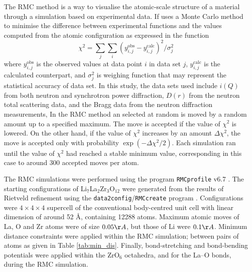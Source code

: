 \documentclass[twoside,twocolumn,9pt]{article}
\begin{document}
The RMC method is a way to visualise the atomic-scale structure of a material through a simulation based on experimental data. If uses a Monte Carlo method to minimise the difference between experimental functions and the values computed from the atomic configuration as expressed in the function
\begin{equation}
\chi^2=\sum_{j}\sum_{i}(y^ \mathrm{obs}_{i,j}-y^ \mathrm{calc}_{i,j})^2/\sigma^2_{j}
\end{equation}
where $y^\mathrm{obs}_{i,j}$ is the observed values at data point $i$ in data set $j$, $y^ \mathrm{calc}_{i,j}$ is the calculated counterpart, and  $\sigma^2_{j}$ is weighing function that may represent the statistical accuracy of data set. In this study, the data sets used include $i(Q)$ from both neutron and  synchrotron power diffraction, $D(r)$ from the neutron total scattering data, and the Bragg data from the neutron diffraction measurements, In the RMC method an selected at random is moved by a random amount up to a specified maximum. The move is accepted if the value of $\chi^2$ is lowered. On the other hand, if the value of $\chi^2$ increases by an amount $\Delta \chi^2$, the move is accepted only with probability $\exp(-\Delta \chi^2/2)$. Each simulation ran until the value of $\chi^2$ had reached a stable minimum value, corresponding in this case to around 300 accepted moves per atom.

The RMC simulations were performed using the program \texttt{RMCprofile} v6.7 \cite{Tucker:2007eh}. The starting configurations of Li$_7$La$_2$Zr$_3$O$_{12}$ were generated from the results of Rietveld refinement using the \texttt{data2config}/\texttt{RMCcreate} program \cite{Dove:2013gk}. Configurations were $4\times 4\times 4$ supercell of the conventional body-centred unit cell with linear dimension of around 52 \AA, containing 12288 atoms. Maximum atomic moves of La, O and Zr atoms were of size $0.05 \AA$, but those of Li were $0.1 \AA$. Minimum distance constraints were applied within the RMC simulation; between  pairs of atoms as given in Table  \ref{tab:min_dis}. Finally, bond-stretching and bond-bending potentials were applied within the ZrO$_6$ octahedra, and for the La--O bonds, during the RMC simulation.
\end{document}

